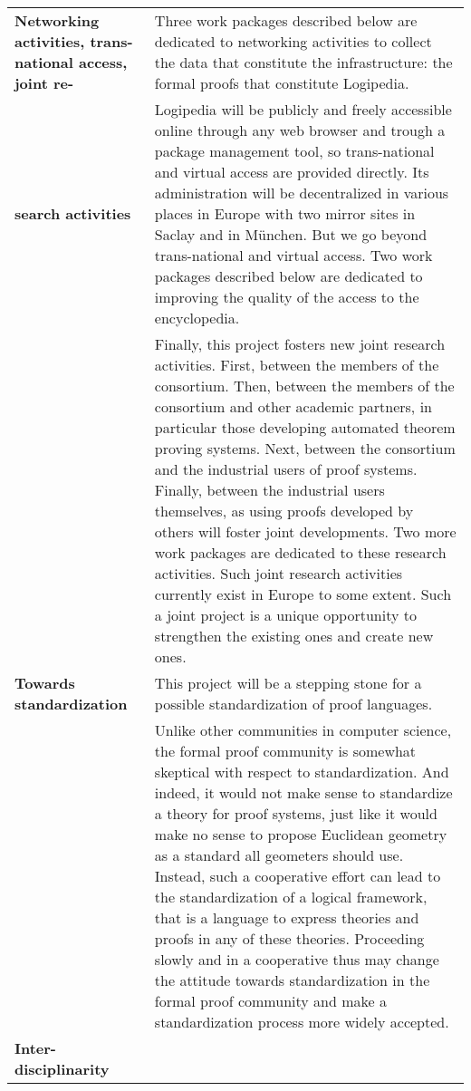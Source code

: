 \begin{longtable}{|p{}|p{}|}
\hline
{\bf Networking activities, trans-national access, joint re-}
&
Three work packages described below are dedicated to networking activities
to collect the data that constitute the infrastructure: the formal proofs
that constitute Logipedia.
\\
{\bf search activities}
&
\hspace{0.4cm}
Logipedia will be publicly and freely accessible online through any
web browser and trough a package management tool, so trans-national
and virtual access are provided directly. Its administration will be
decentralized in various places in Europe with two mirror sites in
Saclay and in München. But we go beyond trans-national and virtual
access.  Two work packages described below are dedicated to improving
the quality of the access to the encyclopedia.\\
&
\hspace{0.4cm}
Finally, this project fosters new joint research activities. First,
between the members of the consortium. Then, between the members of
the consortium and other academic partners, in particular those
developing automated theorem proving systems. Next, between the
consortium and the industrial users of proof systems. Finally, between
the industrial users themselves, as using proofs developed by others
will foster joint developments. Two more work packages are dedicated
to these research activities.  Such joint research activities
currently exist in Europe to some extent.  Such a joint project is a
unique opportunity to strengthen the existing ones and create new
ones.
\\
\hline
{\bf Towards standardization}
&
This project will be a stepping stone for a possible standardization
of proof languages.
\\
&
\hspace{0.4cm}
Unlike other communities in computer science, the formal proof
community is somewhat skeptical with respect to standardization. And
indeed, it would not make sense to standardize a theory for proof
systems, just like it would make no sense to propose Euclidean
geometry as a standard all geometers should use.  Instead, such a
cooperative effort can lead to the standardization of a logical
framework, that is a language to express theories and proofs in any of
these theories. Proceeding slowly and in a cooperative thus may change
the attitude towards standardization in the formal proof community and
make a standardization process more widely accepted.
\\
\hline
{\bf Inter-disciplinarity}

\end{longtable}
